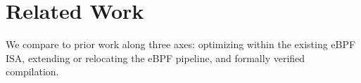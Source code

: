 





\section{Related Work}
\label{sec:related}

We compare \lang to prior work along three axes: optimizing within the existing eBPF ISA, extending or relocating the eBPF pipeline, and formally verified compilation.

